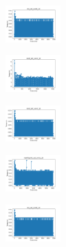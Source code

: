 \vspace*{\fill}
\newpage
\vspace*{\fill}

\begin{figure}[H]    
    \centering
    \begin{subfigure}
        \centering
        \includegraphics[width=0.234\textwidth]{img/am01/iris_set_const_10_949004259_time.png}
    \end{subfigure}
    \hfill
    \begin{subfigure}
        \centering
        \includegraphics[width=0.234\textwidth]{img/am01/ecoli_set_const_10_949004259_time.png}
    \end{subfigure}
    \hfill
    \begin{subfigure}
        \centering
        \includegraphics[width=0.234\textwidth]{img/am01/rand_set_const_10_949004259_time.png}
    \end{subfigure}
    \hfill
    \begin{subfigure}
        \centering
        \includegraphics[width=0.234\textwidth]{img/am01/newthyroid_set_const_10_949004259_time.png}
    \end{subfigure}
    \hfill
    \begin{subfigure}
        \centering
        \includegraphics[width=0.234\textwidth]{img/am01/iris_set_const_10_589741062_time.png}

\end{subfigure}
\end{figure}
